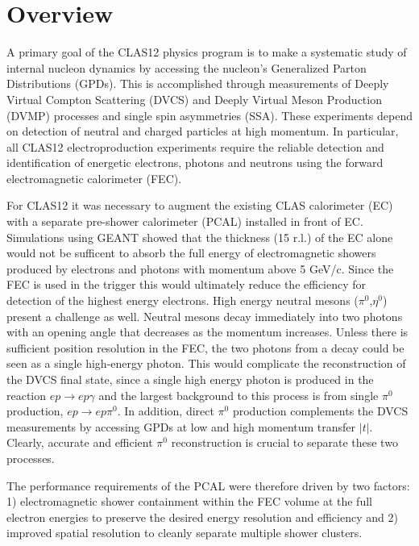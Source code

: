 \section{Overview}

A primary goal of the CLAS12 physics program is to make a systematic study of internal nucleon dynamics by accessing the nucleon's Generalized Parton Distributions (GPDs). This is accomplished through measurements of Deeply Virtual Compton Scattering (DVCS) and Deeply Virtual Meson Production (DVMP) processes and single spin asymmetries (SSA). 
These experiments depend on detection of neutral and charged particles at high momentum. In particular, all CLAS12 electroproduction experiments require the reliable detection and identification of energetic electrons, photons and neutrons using the forward electromagnetic calorimeter (FEC).

For CLAS12 it was necessary to augment the existing CLAS calorimeter (EC) \cite{clas6nim} with a separate pre-shower calorimeter (PCAL) installed in front of EC. Simulations using GEANT showed that the thickness (15 r.l.) of the EC alone would not be sufficent to absorb the full energy of electromagnetic showers produced by electrons and photons with momentum above 5 GeV/c. Since the FEC is used in the trigger this would ultimately reduce the efficiency for detection of the highest energy electrons.  High energy neutral mesons ($\pi^{0}$,$\eta^{0}$) present a challenge as well. Neutral mesons decay immediately into two photons with an opening angle that decreases as the momentum increases. Unless there is sufficient position resolution in the FEC, the two photons from a decay could be seen as a single high-energy photon.  This would complicate the reconstruction of the DVCS final state, since a single high energy photon is produced in the reaction $ep \to ep\gamma$ and the largest background to this process is from single $\pi^{0}$ production, $ep \to ep\pi^{0}$.  In addition, direct $\pi^{0}$ production complements the DVCS measurements by accessing GPDs at low and high momentum transfer $|t|$. Clearly, accurate and efficient $\pi^{0}$ reconstruction is crucial to separate these two processes. 

The performance requirements of the PCAL were therefore driven by two factors: 1) electromagnetic shower containment within the FEC volume at the full electron energies to preserve the desired energy resolution and efficiency and 2) improved spatial resolution to cleanly separate multiple shower clusters.  




